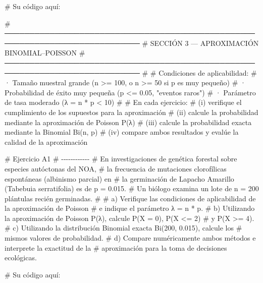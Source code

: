 \documentclass[
  spanish,
  letterpaper,
  DIV=11,
  numbers=noendperiod]{scrreprt}
\newenvironment{Shaded}{\begin{snugshade}}{\end{snugshade}}
\newcommand{\CommentTok}[1]{\textcolor[rgb]{0.37,0.37,0.37}{#1}}
\begin{document}
\begin{Shaded}
\begin{Highlighting}[]
\CommentTok{\# Su código aquí:}


\CommentTok{\# ─────────────────────────────────────────────────────────────────────────────}
\CommentTok{\#  SECCIÓN 3 — APROXIMACIÓN BINOMIAL–POISSON}
\CommentTok{\# ─────────────────────────────────────────────────────────────────────────────}
\CommentTok{\#}
\CommentTok{\#  Condiciones de aplicabilidad:}
\CommentTok{\#    · Tamaño muestral grande (n \textgreater{}= 100, o n \textgreater{}= 50 si p es muy pequeño)}
\CommentTok{\#    · Probabilidad de éxito muy pequeña (p \textless{}= 0.05, "eventos raros")}
\CommentTok{\#    · Parámetro de tasa moderado (λ = n * p \textless{} 10)}
\CommentTok{\#}
\CommentTok{\#  En cada ejercicio:}
\CommentTok{\#    (i)   verifique el cumplimiento de los supuestos para la aproximación}
\CommentTok{\#    (ii)  calcule la probabilidad mediante la aproximación de Poisson P(λ)}
\CommentTok{\#    (iii) calcule la probabilidad exacta mediante la Binomial Bi(n, p)}
\CommentTok{\#    (iv)  compare ambos resultados y evalúe la calidad de la aproximación}


\CommentTok{\# Ejercicio A1}
\CommentTok{\# {-}{-}{-}{-}{-}{-}{-}{-}{-}{-}{-}{-}}
\CommentTok{\# En investigaciones de genética forestal sobre especies autóctonas del NOA,}
\CommentTok{\# la frecuencia de mutaciones clorofílicas espontáneas (albinismo parcial) en}
\CommentTok{\# la germinación de Lapacho Amarillo (Tabebuia serratifolia) es de p = 0.015.}
\CommentTok{\# Un biólogo examina un lote de n = 200 plántulas recién germinadas.}
\CommentTok{\#}
\CommentTok{\# a) Verifique las condiciones de aplicabilidad de la aproximación de Poisson}
\CommentTok{\#    e indique el parámetro λ = n * p.}
\CommentTok{\# b) Utilizando la aproximación de Poisson P(λ), calcule P(X = 0), P(X \textless{}= 2)}
\CommentTok{\#    y P(X \textgreater{}= 4).}
\CommentTok{\# c) Utilizando la distribución Binomial exacta Bi(200, 0.015), calcule los}
\CommentTok{\#    mismos valores de probabilidad.}
\CommentTok{\# d) Compare numéricamente ambos métodos e interprete la exactitud de la}
\CommentTok{\#    aproximación para la toma de decisiones ecológicas.}

\CommentTok{\# Su código aquí:}



\end{Highlighting}
\end{Shaded}
\end{document}
